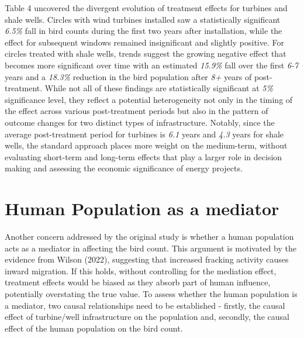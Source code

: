 \documentclass{article}
\begin{document}
\addlinespace

Table 4 uncovered the divergent evolution of treatment effects for turbines and shale wells. Circles with wind turbines installed saw a statistically significant \textit{6.5\%} fall in bird counts during the first two years after installation, while the effect for subsequent windows remained insignificant and slightly positive. For circles treated with shale wells, trends suggest the growing negative effect that becomes more significant over time with an estimated \textit{15.9\%} fall over the first \textit{6-7} years and a \textit{18.3\%} reduction in the bird population after \textit{8+} years of post-treatment. While not all of these findings are statistically significant at \textit{5\%} significance level, they reflect a potential heterogeneity not only in the timing of the effect across various post-treatment periods but also in the pattern of outcome changes for two distinct types of infrastructure. Notably, since the average post-treatment period for turbines is \textit{6.1} years and \textit{4.3} years for shale wells, the standard approach places more weight on the medium-term, without evaluating short-term and long-term effects that play a larger role in decision making and assessing the economic significance of energy projects. 



\section{Human Population as a mediator}

Another concern addressed by the original study is whether a human population acts as a mediator in affecting the bird count. This argument is motivated by the evidence from Wilson (2022), suggesting that increased fracking activity causes inward migration. If this holds, without controlling for the mediation effect, treatment effects would be biased as they absorb part of human influence, potentially overstating the true value. To assess whether the human population is a mediator, two causal relationships need to be established - firstly, the causal effect of turbine/well infrastructure on the population and, secondly, the causal effect of the human population on the bird count. 

\addlinespace
\end{document}
